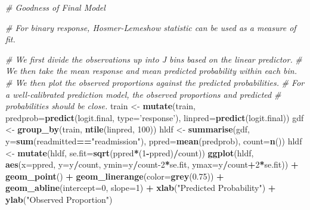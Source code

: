 \documentclass[
]{article}
\newenvironment{Shaded}{\begin{snugshade}}{\end{snugshade}}
\newcommand{\CommentTok}[1]{\textcolor[rgb]{0.56,0.35,0.01}{\textit{#1}}}
\newcommand{\DataTypeTok}[1]{\textcolor[rgb]{0.13,0.29,0.53}{#1}}
\newcommand{\DecValTok}[1]{\textcolor[rgb]{0.00,0.00,0.81}{#1}}
\newcommand{\FloatTok}[1]{\textcolor[rgb]{0.00,0.00,0.81}{#1}}
\newcommand{\KeywordTok}[1]{\textcolor[rgb]{0.13,0.29,0.53}{\textbf{#1}}}
\newcommand{\NormalTok}[1]{#1}
\newcommand{\OperatorTok}[1]{\textcolor[rgb]{0.81,0.36,0.00}{\textbf{#1}}}
\newcommand{\StringTok}[1]{\textcolor[rgb]{0.31,0.60,0.02}{#1}}
\begin{document}
\begin{Shaded}
\begin{Highlighting}[]
\CommentTok{# Goodness of Final Model}

\CommentTok{# For binary response, Hosmer-Lemeshow statistic can be used as a measure of fit.}

\CommentTok{# We first divide the observations up into J bins based on the linear predictor. }
\CommentTok{# We then take the mean response and mean predicted probability within each bin.}
\CommentTok{# We then plot the observed proportions against the predicted probabilities. }
\CommentTok{# For a well-calibrated prediction model, the observed proportions and predicted }
\CommentTok{# probabilities should be close.}
\NormalTok{train <-}\StringTok{ }\KeywordTok{mutate}\NormalTok{(train, }\DataTypeTok{predprob=}\KeywordTok{predict}\NormalTok{(logit.final, }\DataTypeTok{type=}\StringTok{'response'}\NormalTok{), }\DataTypeTok{linpred=}\KeywordTok{predict}\NormalTok{(logit.final))}
\NormalTok{gdf <-}\StringTok{ }\KeywordTok{group_by}\NormalTok{(train, }\KeywordTok{ntile}\NormalTok{(linpred, }\DecValTok{100}\NormalTok{))}
\NormalTok{hldf <-}\StringTok{ }\KeywordTok{summarise}\NormalTok{(gdf, }\DataTypeTok{y=}\KeywordTok{sum}\NormalTok{(readmitted}\OperatorTok{==}\StringTok{"readmission"}\NormalTok{), }\DataTypeTok{ppred=}\KeywordTok{mean}\NormalTok{(predprob), }\DataTypeTok{count=}\KeywordTok{n}\NormalTok{())}
\NormalTok{hldf <-}\StringTok{ }\KeywordTok{mutate}\NormalTok{(hldf, }\DataTypeTok{se.fit=}\KeywordTok{sqrt}\NormalTok{(ppred}\OperatorTok{*}\NormalTok{(}\DecValTok{1}\OperatorTok{-}\NormalTok{ppred)}\OperatorTok{/}\NormalTok{count)) }
\KeywordTok{ggplot}\NormalTok{(hldf, }\KeywordTok{aes}\NormalTok{(}\DataTypeTok{x=}\NormalTok{ppred, }\DataTypeTok{y=}\NormalTok{y}\OperatorTok{/}\NormalTok{count, }\DataTypeTok{ymin=}\NormalTok{y}\OperatorTok{/}\NormalTok{count}\DecValTok{-2}\OperatorTok{*}\NormalTok{se.fit, }\DataTypeTok{ymax=}\NormalTok{y}\OperatorTok{/}\NormalTok{count}\OperatorTok{+}\DecValTok{2}\OperatorTok{*}\NormalTok{se.fit)) }\OperatorTok{+}
\KeywordTok{geom_point}\NormalTok{() }\OperatorTok{+}\StringTok{ }\KeywordTok{geom_linerange}\NormalTok{(}\DataTypeTok{color=}\KeywordTok{grey}\NormalTok{(}\FloatTok{0.75}\NormalTok{)) }\OperatorTok{+}\StringTok{ }\KeywordTok{geom_abline}\NormalTok{(}\DataTypeTok{intercept=}\DecValTok{0}\NormalTok{, }\DataTypeTok{slope=}\DecValTok{1}\NormalTok{) }\OperatorTok{+}\StringTok{ }\KeywordTok{xlab}\NormalTok{(}\StringTok{"Predicted Probability"}\NormalTok{) }\OperatorTok{+}\StringTok{ }\KeywordTok{ylab}\NormalTok{(}\StringTok{"Observed Proportion"}\NormalTok{)}
\end{Highlighting}
\end{Shaded}
\end{document}
